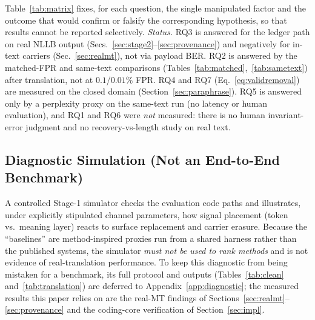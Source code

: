 \documentclass[11pt]{article}
\begin{document}
Table~\ref{tab:matrix} fixes, for each question, the single manipulated factor and the outcome that would confirm or falsify the corresponding hypothesis, so that results cannot be reported selectively. \emph{Status.} RQ3 is answered for the ledger path on real NLLB output (Secs.~\ref{sec:stage2}--\ref{sec:provenance}) and negatively for in-text carriers (Sec.~\ref{sec:realmt}), not via payload BER. RQ2 is answered by the matched-FPR and same-text comparisons (Tables~\ref{tab:matched},~\ref{tab:sametext}) after translation, not at $0.1$/$0.01\%$ FPR. RQ4 and RQ7 (Eq.~\ref{eq:validremoval}) are measured on the closed domain (Section~\ref{sec:paraphrase}). RQ5 is answered only by a perplexity proxy on the same-text run (no latency or human evaluation), and RQ1 and RQ6 were \emph{not} measured: there is no human invariant-error judgment and no recovery-vs-length study on real text.

\subsection{Diagnostic Simulation (Not an End-to-End Benchmark)}
A controlled Stage-1 simulator checks the evaluation code paths and
illustrates, under explicitly stipulated channel parameters, how signal
placement (token vs.\ meaning layer) reacts to surface replacement and
carrier erasure. Because the ``baselines'' are method-inspired proxies run
from a shared harness rather than the published systems, the simulator
\emph{must not be used to rank methods} and is not evidence of
real-translation performance. To keep this diagnostic from being mistaken
for a benchmark, its full protocol and outputs
(Tables~\ref{tab:clean} and~\ref{tab:translation}) are deferred to
Appendix~\ref{app:diagnostic}; the measured results this paper relies on are
the real-MT findings of Sections~\ref{sec:realmt}--\ref{sec:provenance} and
the coding-core verification of Section~\ref{sec:impl}.
\end{document}
